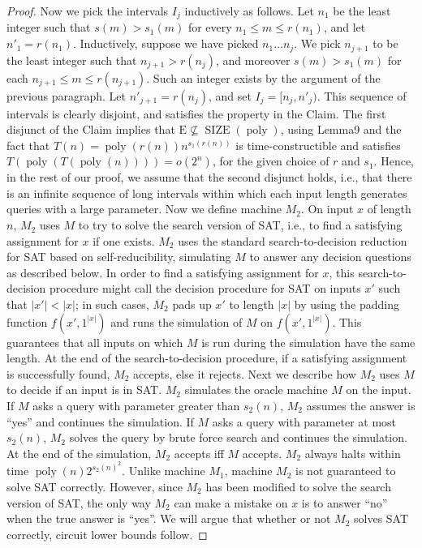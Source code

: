 \documentclass[10pt,a4paper]{article}
\newcommand{\SIZE}{\operatorname{SIZE}}
\newcommand{\poly}{\operatorname{poly}}
\begin{document}
\begin{proof}
Now we pick the intervals $I_j$ inductively as follows. Let $n_1$ be the least integer such that $s(m)>s_1(m)$ for every $n_1\leq m\leq r(n_1)$, and let $n'_1=r(n_1)$. Inductively, suppose we have picked $n_1\ldots n_j$. We pick $n_{j+1}$ to be the least integer such that $n_{j+1}>r(n_j)$, and moreover $s(m)>s_1(m)$ for each $n_{j+1}\leq m\leq r(n_{j+1})$. Such an integer exists by the argument of the previous paragraph. Let $n'_{j+1}=r(n_j)$, and set $I_j=[n_j,n'_j)$. This sequence of intervals is clearly disjoint, and satisfies the property in the Claim.
The first disjunct of the Claim implies that $\mathrm E\not\subseteq\SIZE(\poly)$, using Lemma9 and the fact that $T(n)=\poly(r(n))n^{s_1(r(n))}$ is time-constructible and satisfies $T(\poly(T(\poly(n))))=o(2^n)$, for the given choice of $r$ and $s_1$. Hence, in the rest of our proof, we assume that the second disjunct holds, i.e., that there is an infinite sequence of long intervals within which each input length generates queries with a large parameter.
Now we define machine $M_2$. On input $x$ of length $n$, $M_2$ uses $M$ to try to solve the search version of SAT, i.e., to find a satisfying assignment for $x$ if one exists. $M_2$ uses the standard search-to-decision reduction for SAT based on self-reducibility, simulating $M$ to answer any decision questions as described below. In order to find a satisfying assignment for $x$, this search-to-decision procedure might call the decision procedure for SAT on inputs $x'$ such that $|x'|<|x|$; in such cases, $M_2$ pads up $x'$ to length $|x|$ by using the padding function $f(x',1^{|x|})$ and runs the simulation of $M$ on $f(x',1^{|x|})$. This guarantees that all inputs on which $M$ is run during the simulation have the same length. At the end of the search-to-decision procedure, if a satisfying assignment is successfully found, $M_2$ accepts, else it rejects.
Next we describe how $M_2$ uses $M$ to decide if an input is in SAT. $M_2$ simulates the oracle machine $M$ on the input. If $M$ asks a query with parameter greater than $s_2(n)$, $M_2$ assumes the answer is ``yes'' and continues the simulation. If $M$ asks a query with parameter at most $s_2(n)$, $M_2$ solves the query by brute force search and continues the simulation. At the end of the simulation, $M_2$ accepts iff $M$ accepts.
$M_2$ always halts within time $\poly(n)2^{s_2(n)^2}$. Unlike machine $M_1$, machine $M_2$ is not guaranteed to solve SAT correctly. However, since $M_2$ has been modified to solve the search version of SAT, the only way $M_2$ can make a mistake on $x$ is to answer ``no'' when the true answer is ``yes''. We will argue that whether or not $M_2$ solves SAT correctly, circuit lower bounds follow.

\end{proof}
\end{document}
